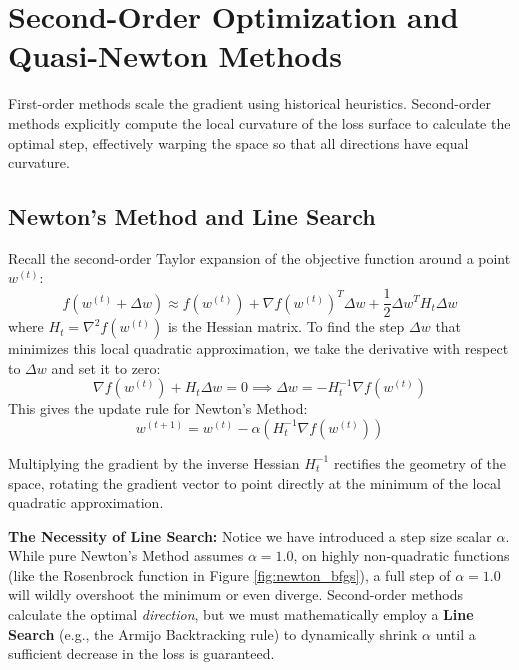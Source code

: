\section{Second-Order Optimization and Quasi-Newton Methods}
\label{sec:newton}

First-order methods scale the gradient using historical heuristics. Second-order methods explicitly compute the local curvature of the loss surface to calculate the optimal step, effectively warping the space so that all directions have equal curvature.

\subsection{Newton's Method and Line Search}
Recall the second-order Taylor expansion of the objective function around a point $w^{(t)}$:
\begin{equation}
    f(w^{(t)} + \Delta w) \approx f(w^{(t)}) + \nabla f(w^{(t)})^T \Delta w + \frac{1}{2} \Delta w^T H_t \Delta w
\end{equation}
where $H_t = \nabla^2 f(w^{(t)})$ is the Hessian matrix. To find the step $\Delta w$ that minimizes this local quadratic approximation, we take the derivative with respect to $\Delta w$ and set it to zero:
\begin{equation}
    \nabla f(w^{(t)}) + H_t \Delta w = 0 \implies \Delta w = -H_t^{-1} \nabla f(w^{(t)})
\end{equation}
This gives the update rule for Newton's Method:
\begin{equation}
    w^{(t+1)} = w^{(t)} - \alpha \left( H_t^{-1} \nabla f(w^{(t)}) \right)
\end{equation}

Multiplying the gradient by the inverse Hessian $H_t^{-1}$ rectifies the geometry of the space, rotating the gradient vector to point directly at the minimum of the local quadratic approximation. 

\textbf{The Necessity of Line Search:} Notice we have introduced a step size scalar $\alpha$. While pure Newton's Method assumes $\alpha=1.0$, on highly non-quadratic functions (like the Rosenbrock function in Figure \ref{fig:newton_bfgs}), a full step of $\alpha=1.0$ will wildly overshoot the minimum or even diverge. Second-order methods calculate the optimal \textit{direction}, but we must mathematically employ a \textbf{Line Search} (e.g., the Armijo Backtracking rule) to dynamically shrink $\alpha$ until a sufficient decrease in the loss is guaranteed.

